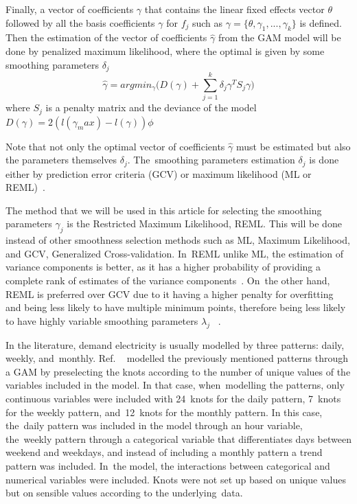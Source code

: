 \documentclass[energies,article,accept,pdftex,moreauthors]{Definitions/mdpi}
\begin{document}
     Finally, a vector of coefficients  $\gamma$ that contains the linear fixed effects vector $\theta$ followed by all the basis coefficients $\gamma$ for $f_j$  such as \(\gamma=\{\theta,\gamma_1,...,\gamma_k\}\) is defined. Then the estimation of the vector of coefficients $\hat{\gamma}$ from the GAM model will be done by penalized maximum likelihood, where the optimal is given by some smoothing parameters $\delta_j$~\citep{Wood2006GeneralizedR}
\begin{equation}
         \hat{\gamma}=argmin_{\gamma} \Bigg( D(\gamma)+\sum_{j=1}^{k}\delta_j\gamma^TS_j\gamma \Bigg )
     \end{equation}
where $S_j$ is a penalty matrix and the deviance of the model \(D(\gamma)=2(l(\gamma_max )-l(\gamma))\phi\)
     
     Note that not only the optimal vector of coefficients $\hat{\gamma}$ must be estimated but also the parameters themselves  $\delta_j$. The~smoothing parameters estimation $\delta_j$ is done either by prediction error criteria (GCV) or maximum likelihood (ML or REML)~\citep{WoodGamDocumentation}.
     
     The method that we will be used in this article for selecting the smoothing parameters  $\gamma_j$  is the Restricted Maximum Likelihood, REML. This will be done instead of other smoothness selection methods such as ML, Maximum Likelihood, and GCV, Generalized Cross-validation.  %
       In~REML unlike ML, the estimation of variance components is better, as it has a higher probability of providing a complete rank of estimates of the variance components~\citep{Vasdekis2005OnData}. On~the other hand, REML is preferred over GCV  due to it having a higher penalty for overfitting and being less likely to have multiple minimum points, therefore being less likely to have highly variable smoothing parameters $\lambda_j$ ~\citep{Wood2010FastGLMs}.
    
    In the literature, demand electricity is usually modelled by three patterns: daily, weekly, and~monthly. Ref. ~\citep{Meier2019Short-termModels} modelled the previously mentioned patterns through a GAM by preselecting the knots according to the number of unique values of the variables included in the model. In that case, when~modelling the patterns, only continuous variables were included with 24~knots for the daily pattern, 7~knots for the weekly pattern, and~12~knots for the monthly pattern. In this case, the~daily pattern was included in the model through an hour variable, the~weekly pattern through a categorical variable that differentiates days between weekend and weekdays, and instead of including a monthly pattern a trend pattern was included. In~the model, the interactions between categorical and numerical variables were included. Knots were not set up based on unique values but on sensible values according to the underlying~data.
    
\end{document}
